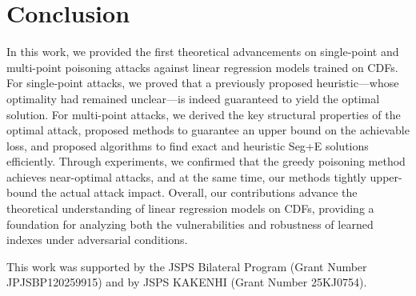 \documentclass[acmsmall]{acmart}
\begin{document}
\section{Conclusion}
\label{sec:conclusion}

In this work, we provided the first theoretical advancements on single-point and multi-point poisoning attacks against linear regression models trained on CDFs.
For single-point attacks, we proved that a previously proposed heuristic---whose optimality had remained unclear---is indeed guaranteed to yield the optimal solution.
For multi-point attacks, we derived the key structural properties of the optimal attack, proposed methods to guarantee an upper bound on the achievable loss, and proposed algorithms to find exact and heuristic Seg+E solutions efficiently.
Through experiments, we confirmed that the greedy poisoning method achieves near-optimal attacks, and at the same time, our methods tightly upper-bound the actual attack impact.
Overall, our contributions advance the theoretical understanding of linear regression models on CDFs, providing a foundation for analyzing both the vulnerabilities and robustness of learned indexes under adversarial conditions.


\begin{acks}
This work was supported by the JSPS Bilateral Program (Grant Number JPJSBP120259915) and by JSPS KAKENHI (Grant Number 25KJ0754).
\end{acks}



\end{document}
